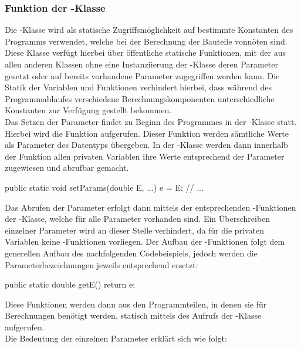 \subsubsection{Funktion der -Klasse}
Die -Klasse wird als statische Zugriffsmöglichkeit auf bestimmte Konstanten des Programms verwendet, welche bei der Berechnung der Bauteile vonnöten sind.
Diese Klasse verfügt hierbei über öffentliche statische Funktionen, mit der aus allen anderen Klassen ohne eine Instanziierung der -Klasse deren Parameter gesetzt oder auf bereits vorhandene Parameter zugegriffen werden kann.
Die Statik der Variablen und Funktionen verhindert hierbei, dass während des Programmablaufes verschiedene  Berechnungskomponenten unterschiedliche Konstanten zur Verfügung gestellt bekommen. \\
Das Setzen der Parameter findet zu Beginn des Programmes in der -Klasse statt.
Hierbei wird die Funktion  aufgerufen.
Dieser Funktion werden sämtliche Werte als Parameter des Datentyps  übergeben.
In der -Klasse werden dann innerhalb der Funktion allen privaten Variablen ihre Werte entsprechend der Parameter zugewiesen und abrufbar gemacht.

\begin{code} 
	public static void setParams(double E, ...){
		e = E;
		// ...
	}
\end{code}

Das Abrufen der Parameter erfolgt dann mittels der entsprechenden -Funktionen der -Klasse, welche für alle Parameter vorhanden sind.
Ein Überschreiben einzelner Parameter wird an dieser Stelle verhindert, da für die privaten Variablen keine -Funktionen vorliegen.
Der Aufbau der -Funktionen folgt dem generellen Aufbau des nachfolgenden Codebeispiels, jedoch werden die Parameterbezeichnungen jeweils entsprechend ersetzt:

\begin{code} 
public static double getE() {
	return e;
}
\end{code}

Diese Funktionen werden dann aus den Programmteilen, in denen sie für Berechnungen benötigt werden, statisch mittels des Aufrufs der -Klasse aufgerufen. \\
Die Bedeutung der einzelnen Parameter erklärt sich wie folgt:

